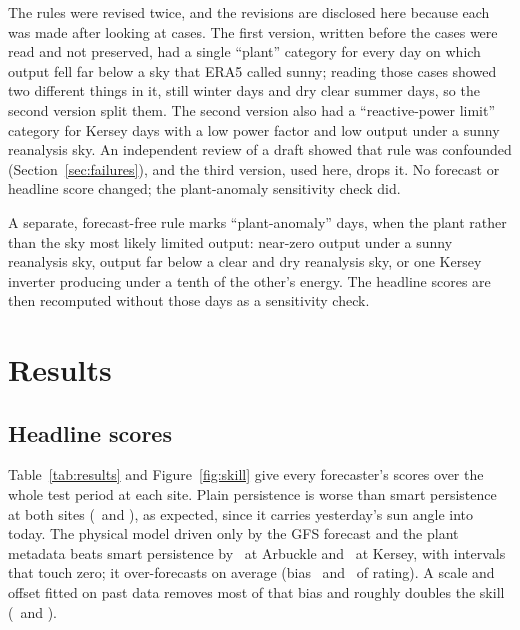 \documentclass[11pt]{article}
\begin{document}
The rules were revised twice, and the revisions are disclosed here because each was made after looking at cases. The first version, written before the cases were read and not preserved, had a single ``plant'' category for every day on which output fell far below a sky that ERA5 called sunny; reading those cases showed two different things in it, still winter days and dry clear summer days, so the second version split them. The second version also had a ``reactive-power limit'' category for Kersey days with a low power factor and low output under a sunny reanalysis sky. An independent review of a draft showed that rule was confounded (Section~\ref{sec:failures}), and the third version, used here, drops it. No forecast or headline score changed; the plant-anomaly sensitivity check did.

A separate, forecast-free rule marks ``plant-anomaly'' days, when the plant rather than the sky most likely limited output: near-zero output under a sunny reanalysis sky, output far below a clear and dry reanalysis sky, or one Kersey inverter producing under a tenth of the other's energy. The headline scores are then recomputed without those days as a sensitivity check.

\section{Results}

\subsection{Headline scores}

Table~\ref{tab:results} and Figure~\ref{fig:skill} give every forecaster's scores over the whole test period at each site. Plain persistence is worse than smart persistence at both sites (\ArbPersSkill\ and \KerPersSkill), as expected, since it carries yesterday's sun angle into today. The physical model driven only by the GFS forecast and the plant metadata beats smart persistence by \ArbPhysSkill\ at Arbuckle and \KerPhysSkill\ at Kersey, with intervals that touch zero; it over-forecasts on average (bias \ArbPhysBias\ and \KerPhysBias\ of rating). A scale and offset fitted on past data removes most of that bias and roughly doubles the skill (\ArbPhysCalSkill\ and \KerPhysCalSkill).

\begin{table}[t]
\centering
\small

\caption{Scores over every scored hour (Arbuckle \ArbFirst\ to \ArbLast, \ArbHours\ hours; Kersey \KerFirst\ to \KerLast, \KerHours\ hours). nMAE and nRMSE are fractions of AC rating; skill is against smart persistence. The ERA5 row uses the weather that happened and is not a forecast.}
\label{tab:results}
\end{table}
\end{document}
